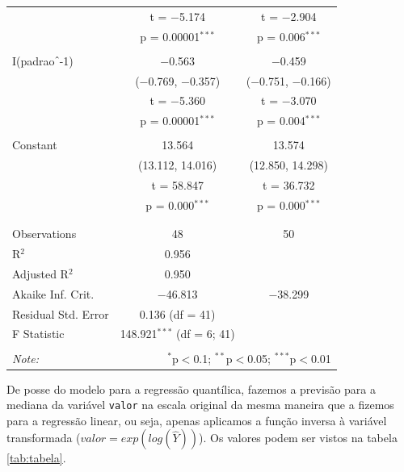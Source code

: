 \documentclass[a4paper]{article}
\begin{document}
\begin{table}[!htbp]
\begin{tabular}{@{\extracolsep{5pt}}lcc}
  & t = $-$5.174 & t = $-$2.904 \\ 
  & p = 0.00001$^{***}$ & p = 0.006$^{***}$ \\ 
  & & \\ 
 I(padrao$\hat{\mkern6mu}$-1) & $-$0.563 & $-$0.459 \\ 
  & ($-$0.769, $-$0.357) & ($-$0.751, $-$0.166) \\ 
  & t = $-$5.360 & t = $-$3.070 \\ 
  & p = 0.00001$^{***}$ & p = 0.004$^{***}$ \\ 
  & & \\ 
 Constant & 13.564 & 13.574 \\ 
  & (13.112, 14.016) & (12.850, 14.298) \\ 
  & t = 58.847 & t = 36.732 \\ 
  & p = 0.000$^{***}$ & p = 0.000$^{***}$ \\ 
  & & \\ 
\hline \\[-1.8ex] 
Observations & 48 & 50 \\ 
R$^{2}$ & 0.956 &  \\ 
Adjusted R$^{2}$ & 0.950 &  \\ 
Akaike Inf. Crit. & $-$46.813 & $-$38.299 \\ 
Residual Std. Error & 0.136 (df = 41) &  \\ 
F Statistic & 148.921$^{***}$ (df = 6; 41) &  \\ 
\hline 
\hline \\[-1.8ex] 
\textit{Note:}  & \multicolumn{2}{r}{$^{*}$p$<$0.1; $^{**}$p$<$0.05; $^{***}$p$<$0.01} \\ 
\end{tabular} 
\end{table}

De posse do modelo para a regressão quantílica, fazemos a previsão para
a mediana da variável \texttt{valor} na escala original da mesma maneira
que a fizemos para a regressão linear, ou seja, apenas aplicamos a
função inversa à variável transformada (\(valor = exp(log(\hat{Y}))\)).
Os valores podem ser vistos na tabela \ref{tab:tabela}.

\end{document}
